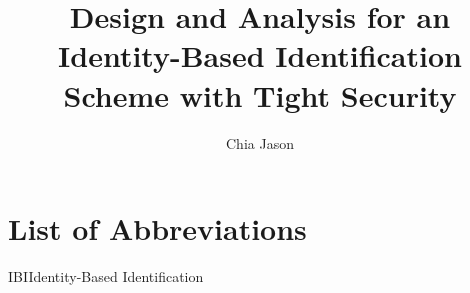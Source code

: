 \documentclass{foefyp}
\author{Chia Jason}
\title{Design and Analysis for an Identity-Based Identification Scheme with Tight Security}
\begin{document}

\frontmatter
\copyrightpage

{\clearpage\SingleSpacing
\tableofcontents\clearpage
\listoftables\clearpage
\listoffigures\clearpage
\chapter{List of Abbreviations}
IBI\quad\quad Identity-Based Identification
\clearpage
}

\mainmatter







\backmatter

\printbibliography[title=REFERENCES,heading=bibintoc]
\end{document}

